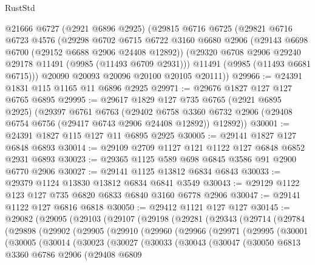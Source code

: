 \begin{lexlean}{RustStd}
\begin{coremodule}
    @21666
    @6727
    (@2921 @6896 @2925)
    (@29815
      @6716
      @6725
      (@29821
        @6716
        @6723
        @4576
        (@29298
          @6702
          @6715
          @6722
          @3160
          @6680
          @2906
          (@29143 @6698 @6700 (@29152 @6688 @2906 @24408 @12892))
          (@29320 @6708 @2906 @29240 @29178 @11491 (@9985 (@11493 @6709 @2931)))
          @11491
          (@9985 (@11493 @6681 @6715)))
        @20090
        @20093
        @20096
        @20100
        @20105
        @20111))
@29966 := @24391 @1831 @115 @1165 @11 @6896 @2925
@29971 := @29676 @1827 @127 @127 @6765 @6895
@29995 := @29617
    @1829
    @127
    @735
    @6765
    (@2921 @6895 @2925)
    (@29397
      @6761
      @6763
      (@29402
        @6758
        @3360
        @6732
        @2906
        (@29408 @6754 @6756 (@29417 @6743 @2906 @24408 @12892))
        @12892))
@30001 := @24391 @1827 @115 @127 @11 @6895 @2925
@30005 := @29141 @1827 @127 @6848 @6893
@30014 := @29109 @2709 @1127 @121 @1122 @127 @6848 @6852 @2931 @6893
@30023 := @29365 @1125 @589 @698 @6845 @3586 @91 @2900 @6770 @2906
@30027 := @29141 @1125 @13812 @6834 @6843
@30033 := @29379 @1124 @13830 @13812 @6834 @6841 @3549
@30043 := @29129 @1122 @123 @127 @735 @6820 @6833 @6840 @3160 @6778 @2906
@30047 := @29141 @1122 @127 @6816 @6818
@30050 := @29412 @1121 @127 @127
@30145 := @29082
    (@29095
      (@29103
        (@29107
          (@29198
            (@29281
              (@29343
                (@29714
                  (@29784
                    (@29898
                      (@29902
                        (@29905
                          (@29910
                            (@29960
                              (@29966
                                (@29971
                                  (@29995
                                    (@30001
                                      (@30005
                                        (@30014
                                          (@30023
                                            (@30027
                                              (@30033
                                                (@30043
                                                  (@30047
                                                    (@30050
                                                      @6813
                                                      @3360
                                                      @6786
                                                      @2906
                                                      (@29408
                                                        @6809

\end{coremodule}
\end{lexlean}

